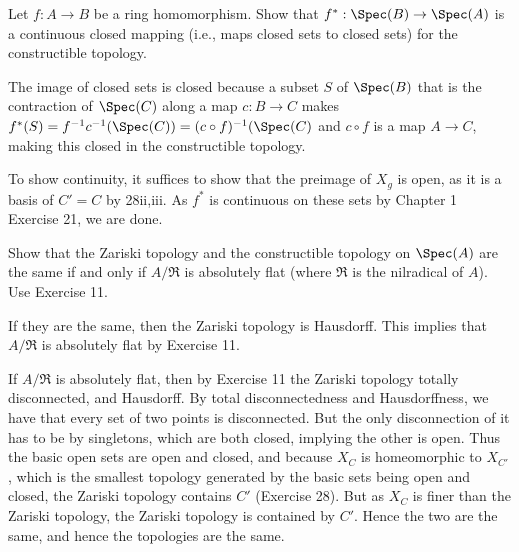 \begin{questions}
\question Let $f: A\to B $ be a ring homomorphism. Show that $f^\ast: \Spec(B) \to \Spec(A) $ is a continuous closed mapping (i.e., maps closed sets to closed sets) for the constructible topology.
\begin{solution}
	The image of closed sets is closed because a subset $S $ of $\Spec(B) $ that is the contraction of $\Spec(C) $ along a map $c: B \to C $ makes $f^\ast(S) = f^{-1}c^{-1}(\Spec(C)) = (c\circ f)^{-1}(\Spec(C)$ and $c\circ f $ is a map $A\to C $, making this closed in the constructible topology.

	To show continuity, it suffices to show that the preimage of $X_g$ is open, as it is a basis of $C'=C$ by 28ii,iii.
	As $f^\ast $ is continuous on these sets by Chapter 1 Exercise 21, we are done.
\end{solution}

\question Show that the Zariski topology and the constructible topology on $\Spec(A) $ are the same if and only if $A / \mathfrak{R} $ is absolutely flat (where $\mathfrak{R} $ is the nilradical of $A $).
\ifhint
	Use Exercise 11.
\fi
\begin{solution}
	If they are the same, then the Zariski topology is Hausdorff.
	This implies that $A / \mathfrak{R} $ is absolutely flat by Exercise 11.

	If $A / \mathfrak{R} $ is absolutely flat, then by Exercise 11 the Zariski topology totally disconnected, and Hausdorff.
	By total disconnectedness and Hausdorffness, we have that every set of two points is disconnected.
	But the only disconnection of it has to be by singletons, which are both closed, implying the other is open.
	Thus the basic open sets are open and closed, and because $X_C $ is homeomorphic to $X_{C'} $, which is the smallest topology generated by the basic sets being open and closed, the Zariski topology contains $C' $ (Exercise 28).
	But as $X_C $ is finer than the Zariski topology, the Zariski topology is contained by $C'$.
	Hence the two are the same, and hence the topologies are the same.
\end{solution}
\end{questions}
